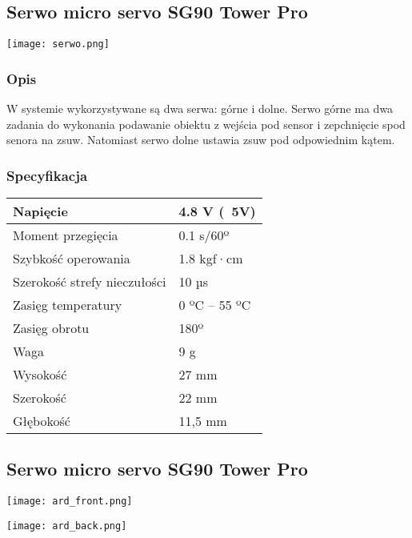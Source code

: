 \documentclass[12pt]{article}
\begin{document}
\subsection{Serwo micro servo SG90 Tower Pro}
\begin{center}
\begin{minipage}[H]{.85\textwidth}
    \texttt{[image: serwo.png]}
\end{minipage}
\end{center}
\subsubsection{Opis}
W systemie wykorzystywane są dwa serwa: górne i dolne. Serwo górne ma dwa zadania do wykonania podawanie obiektu z wejścia pod sensor i zepchnięcie spod senora na zsuw. Natomiast serwo dolne ustawia zsuw pod odpowiednim kątem.
\subsubsection{Specyfikacja}
\begin{center}
\begin{tabular}{ | m{5cm} | m{3cm} | } 
\hline
Napięcie &  4.8 V (~5V)\\ 
\hline
Moment przegięcia & 0.1 s/60º\\ 
\hline
Szybkość operowania & 1.8 kgf·cm\\ 
\hline
Szerokość strefy nieczułości & 10 µs \\ 
\hline
Zasięg temperatury &  0 ºC – 55 ºC  \\ 
\hline
Zasięg obrotu &  180º  \\ 
\hline
Waga &  9 g  \\ 
\hline
Wysokość & 27 mm\\
\hline
Szerokość & 22 mm\\
\hline
Głębokość & 11,5 mm\\
\hline
\end{tabular}
\end{center}

\subsection{Serwo micro servo SG90 Tower Pro}
\begin{center}
\begin{minipage}[H]{.8\textwidth}
    \texttt{[image: ard\_front.png]}
\end{minipage}
\begin{minipage}[H]{.8\textwidth}
    \texttt{[image: ard\_back.png]}
\end{minipage}
\end{center}
\end{document}
